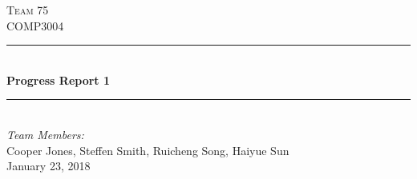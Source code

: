 \documentclass[12pt]{article} %
\begin{document}

\begin{titlepage}

\newcommand{\HRule}{\rule{\linewidth}{0.5mm}} %

\center %

\textsc{\Huge Team 75}\\[0.5cm] %
\textsc{\Large COMP3004}\\[0.5cm] %

\HRule \\[0.4cm]
{ \huge \bfseries Progress Report 1}\\[0.4cm] %
\HRule \\[1.5cm]



\emph{Team Members:}\\
Cooper Jones, Steffen Smith, Ruicheng Song, Haiyue Sun\\[4cm]

{\large January 23, 2018}\\[3cm] %


\vfill %

\end{titlepage}




\end{document}
